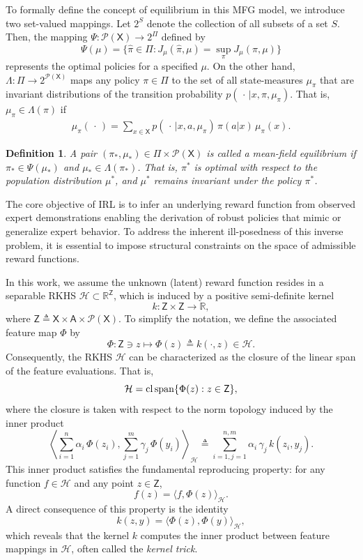 \documentclass[11pt]{article}
\newcommand{\R}{\mathbb{R}}
\newcommand{\cl}{\mathop{\rm cl}}
\newcommand{\cspan}{\mathop{\rm span}}
\newcommand{\sX}{{\mathsf X}}
\newcommand{\sA}{{\mathsf A}}
\newcommand{\sZ}{{\mathsf Z}}
\newcommand{\cH}{{\mathcal H}}
\newcommand{\Pnew}{{\mathcal P}}
\newtheorem{definition}{Definition}[section]
\begin{document}
To formally define the concept of equilibrium in this MFG model, we introduce two set-valued mappings. Let $2^{S}$ denote the collection of all subsets of a set $S$. Then, the mapping $\Psi : \Pnew(\sX) \rightarrow 2^{\Pi}$ defined by
$$\Psi(\mu) = \{\hat{\pi} \in \Pi: J_{\mu}(\hat{\pi},\mu) = \sup_{\pi} J_{\mu}(\pi,\mu) \}$$
represents the optimal policies for a specified $\mu$.
On the other hand, $\Lambda : \Pi \to 2^{\Pnew(\sX)}$ maps any policy $\pi \in \Pi$ to the set of all state-measures $\mu_{\pi}$ that are invariant distributions of the transition probability $p(\,\cdot\,|x,\pi,\mu_{\pi})$. That is, $\mu_{\pi} \in \Lambda(\pi)$ if
\begin{align}
\mu_{\pi}(\,\cdot\,) = \sum_{x \in \sX} p(\,\cdot\,|x,a,\mu_{\pi}) \, \pi(a|x) \, \mu_{\pi}(x). \nonumber
\end{align}

\begin{definition}
A pair $(\pi_*,\mu_*) \in \Pi \times \Pnew(\sX)$ is called a mean-field equilibrium if $\pi_* \in \Psi(\mu_*)$ and $\mu_* \in \Lambda(\pi_*)$. That is, $\pi^*$ is  optimal with respect to the population distribution $\mu^*$, and $\mu^*$ remains invariant under the policy $\pi^*$.
\end{definition}

The core objective of IRL is to infer an underlying reward function from observed expert demonstrations enabling the derivation of robust policies that mimic or generalize expert behavior. To address the inherent ill-posedness of this inverse problem, it is essential to impose structural constraints on the space of admissible reward functions.

In this work, we assume the unknown (latent) reward function resides in a separable RKHS $\cH \subset \R^{\sZ}$, which is induced by a positive semi-definite kernel
$$
k: \sZ \times \sZ \rightarrow \R,
$$
where $\sZ \triangleq \sX \times \sA \times \Pnew(\sX)$. To simplify the notation, we define the associated feature map $\Phi$ by 
$$
\Phi: \sZ \ni z \mapsto \Phi(z) \triangleq k(\cdot,z) \in \cH.
$$
Consequently, the RKHS $\mathcal{H}$ can be characterized as the closure of the linear span of the feature evaluations. That is,
$$
\cH = \cl \cspan\{\Phi(z): z \in \sZ\},
$$
where the closure is taken with respect to the norm topology induced by the inner product
$$
\left \langle \sum_{i=1}^n \alpha_i \, \Phi(z_i), \sum_{j=1}^m \gamma_j \, \Phi(y_i) \right \rangle_{\cH} \triangleq \sum_{i=1,j=1}^{n,m} \alpha_i \, \gamma_j \, k(z_i,y_j).
$$
This inner product satisfies the fundamental reproducing property: for any function $f \in \mathcal{H}$ and any point $z \in \sZ$,
$$
f(z) = \langle f, \Phi(z) \rangle_{\cH}.
$$
A direct consequence of this property is the identity
$$
k(z,y) = \langle \Phi(z),\Phi(y) \rangle_{\cH},
$$
which reveals that the kernel $k$ computes the inner product between feature mappings in $\mathcal{H}$, often called the \textit{kernel trick}.
\end{document}
